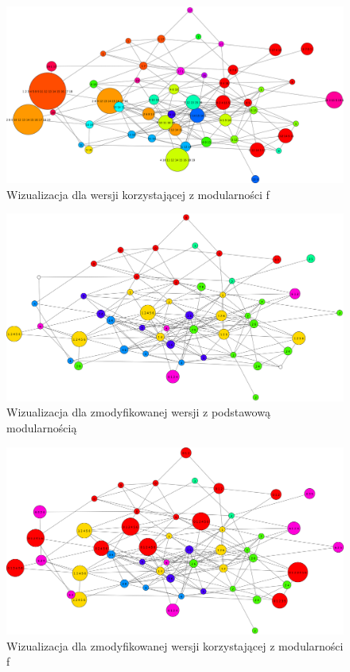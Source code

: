 \documentclass{article}
\begin{document}
\begin{figure}[H]
\centering
\includegraphics[width=\textwidth]{images/bt-sample-6.png}
\caption{Wizualizacja dla wersji korzystającej z modularności f}
\end{figure}
\begin{figure}[H]
\centering
\includegraphics[width=\textwidth]{images/bt-sample-7.png}
\caption{Wizualizacja dla zmodyfikowanej wersji z podstawową modularnością}
\end{figure}

\begin{figure}[H]
\centering
\includegraphics[width=\textwidth]{images/bt-sample-8.png}
\caption{Wizualizacja dla zmodyfikowanej wersji korzystającej z modularności f}
\end{figure}
\end{document}
